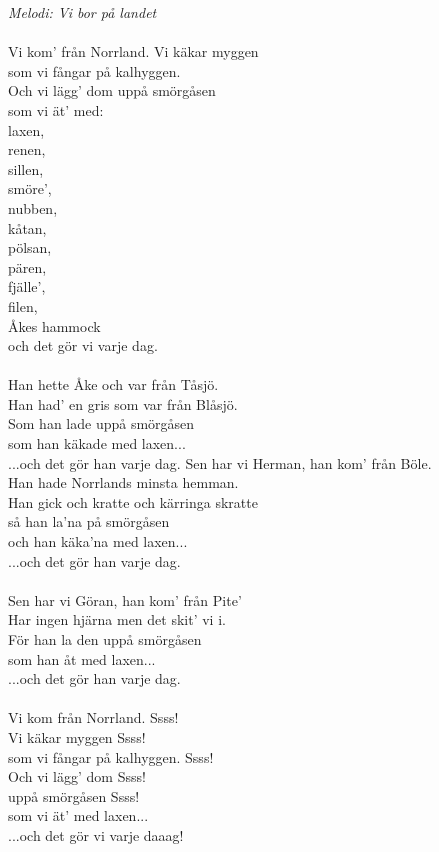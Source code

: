 {\footnotesize\textit{Melodi: Vi bor på landet}}\\
\\
Vi kom' från Norrland. Vi käkar myggen\\
som vi fångar på kalhyggen.\\
Och vi lägg' dom uppå smörgåsen\\
som vi ät' med:\\
\hspace*{25pt} laxen,\\
\hspace*{25pt} renen,\\
\hspace*{25pt} sillen,\\
\hspace*{25pt} smöre',\\
\hspace*{25pt} nubben,\\
\hspace*{25pt} kåtan,\\
\hspace*{25pt} pölsan,\\
\hspace*{25pt} pären,\\
\hspace*{25pt} fjälle',\\
\hspace*{25pt} filen,\\
\hspace*{25pt} Åkes hammock\\
 och det gör vi varje dag.\\
\\
Han hette Åke och var från Tåsjö.\\
Han had' en gris som var från Blåsjö.\\
Som han lade uppå smörgåsen\\
som han käkade med laxen...\\
...och det gör han varje dag.
\newpage
Sen har vi Herman, han kom' från Böle.\\
Han hade Norrlands minsta hemman.\\
Han gick och kratte och kärringa skratte\\
så han la'na på smörgåsen\\
och han käka'na med laxen...\\
...och det gör han varje dag.\\
\\
Sen har vi Göran, han kom' från Pite'\\
Har ingen hjärna men det skit' vi i.\\
För han la den uppå smörgåsen\\
som han åt med laxen...\\
...och det gör han varje dag.\\
\\
Vi kom från Norrland. Ssss!\\
Vi käkar myggen Ssss!\\
som vi fångar på kalhyggen. Ssss!\\
Och vi lägg' dom Ssss!\\
uppå smörgåsen Ssss!\\
som vi ät' med laxen...\\
...och det gör vi varje daaag!
